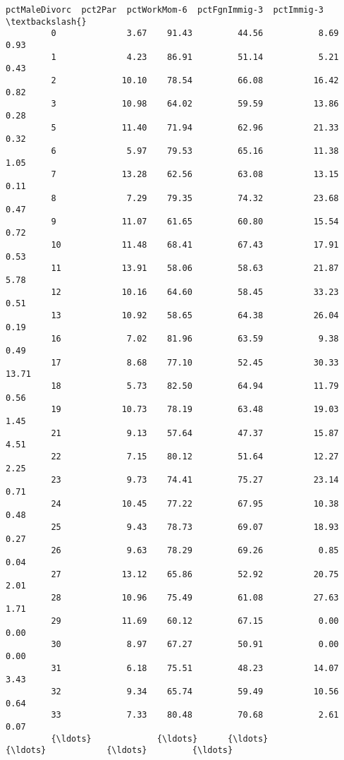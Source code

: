 \documentclass[11pt]{llncs}
\begin{document}
\begin{Verbatim}[commandchars=\\\{\}]
               pctMaleDivorc  pct2Par  pctWorkMom-6  pctFgnImmig-3  pctImmig-3  \textbackslash{}
         0              3.67    91.43         44.56           8.69        0.93   
         1              4.23    86.91         51.14           5.21        0.43   
         2             10.10    78.54         66.08          16.42        0.82   
         3             10.98    64.02         59.59          13.86        0.28   
         5             11.40    71.94         62.96          21.33        0.32   
         6              5.97    79.53         65.16          11.38        1.05   
         7             13.28    62.56         63.08          13.15        0.11   
         8              7.29    79.35         74.32          23.68        0.47   
         9             11.07    61.65         60.80          15.54        0.72   
         10            11.48    68.41         67.43          17.91        0.53   
         11            13.91    58.06         58.63          21.87        5.78   
         12            10.16    64.60         58.45          33.23        0.51   
         13            10.92    58.65         64.38          26.04        0.19   
         16             7.02    81.96         63.59           9.38        0.49   
         17             8.68    77.10         52.45          30.33       13.71   
         18             5.73    82.50         64.94          11.79        0.56   
         19            10.73    78.19         63.48          19.03        1.45   
         21             9.13    57.64         47.37          15.87        4.51   
         22             7.15    80.12         51.64          12.27        2.25   
         23             9.73    74.41         75.27          23.14        0.71   
         24            10.45    77.22         67.95          10.38        0.48   
         25             9.43    78.73         69.07          18.93        0.27   
         26             9.63    78.29         69.26           0.85        0.04   
         27            13.12    65.86         52.92          20.75        2.01   
         28            10.96    75.49         61.08          27.63        1.71   
         29            11.69    60.12         67.15           0.00        0.00   
         30             8.97    67.27         50.91           0.00        0.00   
         31             6.18    75.51         48.23          14.07        3.43   
         32             9.34    65.74         59.49          10.56        0.64   
         33             7.33    80.48         70.68           2.61        0.07   
         {\ldots}             {\ldots}      {\ldots}           {\ldots}            {\ldots}         {\ldots}   

\end{Verbatim}
\end{document}
